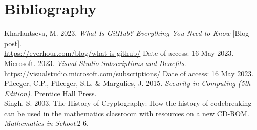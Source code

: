 \newpage
\section{Bibliography\\}

Kharlantseva, M. 2023, \emph{What Is GitHub? Everything You Need to Know} [Blog post]. \\
\url{https://everhour.com/blog/what-is-github/} Date of access: 16 May 2023. \\

Microsoft. 2023. \emph{Visual Studio Subscriptions and Benefits}.\\ \url{https://visualstudio.microsoft.com/subscriptions/} Date of access: 16 May 2023.\\

Pfleeger, C.P., Pfleeger, S.L. \& Margulies, J. 2015. \emph{Security in Computing (5th Edition)}. Prentice Hall Press.\\

Singh, S. 2003. The History of Cryptography: How the history of codebreaking can be used in the mathematics classroom with resources on a new CD-ROM. \emph{Mathematics in School}:2-6. 


